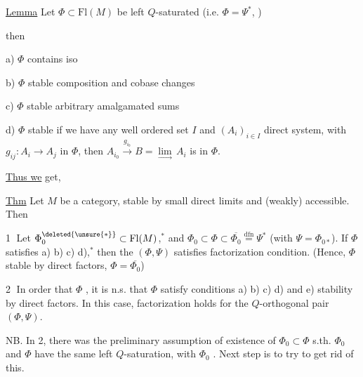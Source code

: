 
\uline{Lemma} Let $\Phi\subset\mathrm{Fl}(M)$ be left $Q$-saturated (i.e. $\Phi=\Psi^*$, )

then  \unsure{(}

a) $\Phi$ contains iso

b) $\Phi$ stable   composition and cobase changes

c) $\Phi$ stable    arbitrary  amalgamated sums


d) $\Phi$ stable    if we have any well ordered set $I$ and $(A_i)_{i\in I}$ direct system, with $g_{ij}\colon A_i\to A_j$ in $\Phi$,  then  $A_{i_0}\xrightarrow{g_{i_0}}B=\underset{\longrightarrow}{\lim}\, A_i$ is in $\Phi$.


\uline{Thus we} get,

\uline{Thm} Let $M$ be a category, stable by small direct limits and (weakly) accessible. Then

\textcircled{1}  Let $\Phi_0^{\deleted{\unsure{*}}}\subset\mathrm{Fl}(M)$,$^*$ and $\Phi_0\subset\Phi\subset\overline{\Phi_0}\overset{\mathrm{dfn}}{=}\Psi^*$ (with $\Psi=\Phi_{0*}$). If $\Phi$  satisfies a) b) c) d),$^*$ then the $(\Phi,\Psi)$ satisfies factorization condition. (Hence, $\Phi$ stable by direct factors, $\Phi=\overline{\Phi_0}$)



\textcircled{2}  In order that $\Phi$  , it is n.s. that $\Phi$ satisfy conditions a) b) c) d) and e) stability by direct factors. In this case, factorization holds for the $Q$-orthogonal pair $(\Phi,\Psi)$.

NB. In 2,  there was the preliminary assumption of existence of $\Phi_0\subset\Phi$ s.th. $\Phi_0$ and $\Phi$ have the same left $Q$-saturation, with $\Phi_0$ . Next step is to try to get rid of this.
